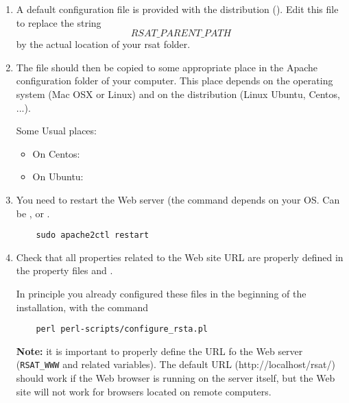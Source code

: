 \documentclass[12pt,a4paper, twoside]{scrreprt} %
\begin{document}
\begin{enumerate}
\item A default configuration file is provided with the \RSAT
  distribution (). Edit this file to
  replace the string \texttt{\[RSAT\_PARENT\_PATH\]} by the actual
  location of your rsat folder.
  
\item The file should then be copied to some appropriate place in the
  Apache configuration folder of your computer. This place depends on
  the operating system (Mac OSX or Linux) and on the distribution
  (Linux Ubuntu, Centos, ...).
  
  Some Usual places:
  \begin{itemize}
  \item On Centos: 
  \item On Ubuntu: 
  \end{itemize}
  
\item You need to restart the Web server (the command depends on your
  OS. Can be ,  or
  .

  \begin{lstlisting}
    sudo apache2ctl restart
  \end{lstlisting}

\item Check that all properties related to the Web site URL are
  properly defined in the \RSAT property files
   and
  . 

  In principle you already configured these files in the beginning of
  the installation, with the command
  \begin{lstlisting}
    perl perl-scripts/configure_rsta.pl
  \end{lstlisting}

  \textbf{Note:} it is important to properly define the URL fo the Web
  server (\texttt{RSAT\_WWW} and related variables). The default URL
  (http://localhost/rsat/) should work if the Web browser is running
  on the server itself, but the Web site will not work for browsers
  located on remote computers.

\end{enumerate}




\end{document}
